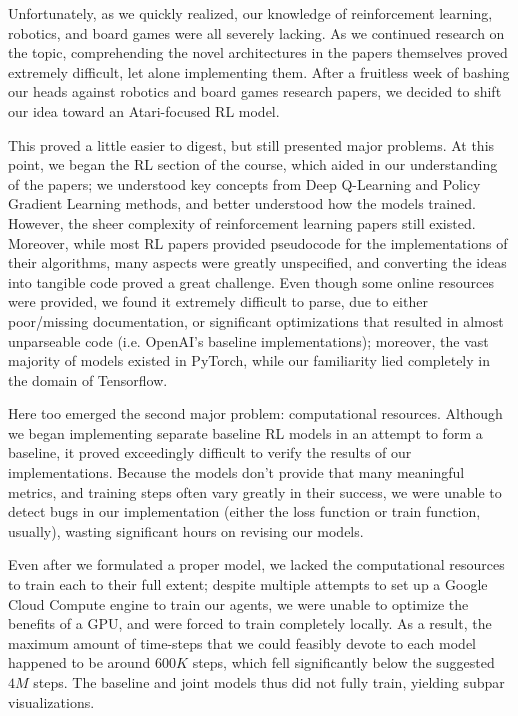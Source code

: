 \documentclass{article} %
\begin{document}
Unfortunately, as we quickly realized, our knowledge of reinforcement learning, robotics, and board
games were all severely lacking. As we continued research on the topic, comprehending the novel
architectures in the papers themselves proved extremely difficult, let alone implementing them.
After a fruitless week of bashing our heads against robotics and board games research papers, we
decided to shift our idea toward an Atari-focused RL model.

This proved a little easier to digest, but still presented major problems. At this point, we began
the RL section of the course, which aided in our understanding of the papers; we understood key
concepts from Deep Q-Learning and Policy Gradient Learning methods, and better understood how the
models trained. However, the sheer complexity of reinforcement learning papers still existed.
Moreover, while most RL papers provided pseudocode for the implementations of their algorithms, many
aspects were greatly unspecified, and converting the ideas into tangible code proved a great
challenge. Even though some online resources were provided, we found it extremely difficult to
parse, due to either poor/missing documentation, or significant optimizations that resulted in
almost unparseable code (i.e. OpenAI's baseline implementations); moreover, the vast majority of
models existed in PyTorch, while our familiarity lied completely in the domain of Tensorflow.

Here too emerged the second major problem: computational resources. Although we began implementing
separate baseline RL models in an attempt to form a baseline, it proved exceedingly difficult to
verify the results of our implementations. Because the models don't provide that many meaningful
metrics, and training steps often vary greatly in their success, we were unable to detect bugs in
our implementation (either the loss function or train function, usually), wasting significant hours
on revising our models.

Even after we formulated a proper model, we lacked the computational resources to train each to
their full extent; despite multiple attempts to set up a Google Cloud Compute engine to train our
agents, we were unable to optimize the benefits of a GPU, and were forced to train completely
locally. As a result, the maximum amount of time-steps that we could feasibly devote to each model
happened to be around $600K$ steps, which fell significantly below the suggested $4M$ steps. The
baseline and joint models thus did not fully train, yielding subpar visualizations.
\end{document}
